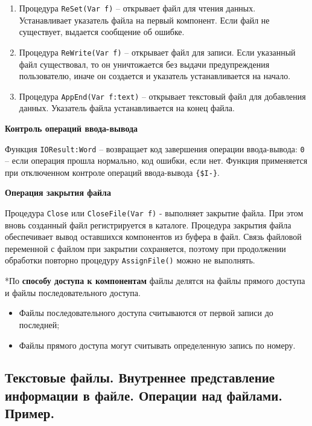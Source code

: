 \begin{enumerate}
    \item Процедура {\texttt{ReSet(Var f)}} – открывает файл для чтения данных. 
	Устанавливает указатель файла на первый компонент. Если файл не существует, выдается сообщение об ошибке.
    \item Процедура {\tt ReWrite(Var f)} – открывает файл для записи. 
	Если указанный файл существовал, то он уничтожается без выдачи предупреждения пользователю, иначе он создается и указатель устанавливается на начало.
    \item Процедура {\tt AppEnd(Var f:text)} – открывает текстовый файл для добавления данных. Указатель файла устанавливается на конец файла.
\end{enumerate}

\noindent
{\bf Контроль операций ввода-вывода}

Функция \texttt{IOResult:Word} – возвращает код завершения операции ввода-вывода: \texttt{0} – если операция прошла нормально, код ошибки, если нет. Функция применяется при отключенном контроле операций ввода-вывода \texttt{\{\$I-\}}. 

\noindent
{\bf Операция закрытия файла}

Процедура \texttt{Close} или \texttt{CloseFile(Var f)} - выполняет закрытие файла. При этом вновь созданный файл регистрируется в каталоге. Процедура закрытия файла обеспечивает вывод оставшихся компонентов из буфера в файл. Связь файловой переменной с файлом при закрытии сохраняется, поэтому при продолжении обработки повторно процедуру \texttt{AssignFile()} можно не выполнять. 

\noindent
*По {\bf{способу доступа к компонентам}} файлы делятся на файлы прямого доступа и файлы
последовательного доступа. 
\begin{itemize}
    \item Файлы последовательного доступа считываются от первой записи до последней;
    \item Файлы прямого доступа могут считывать определенную запись по номеру.
\end{itemize}




\newpage\subsection{Текстовые  файлы.  Внутреннее  представление  информации  в  файле.  Операции  над  файлами. Пример. }

